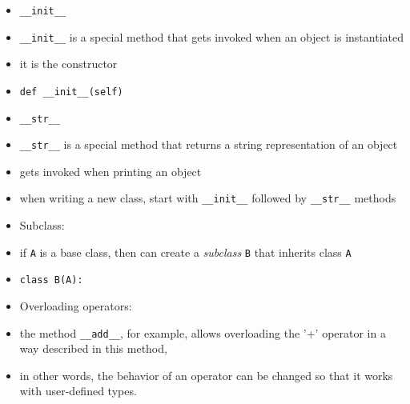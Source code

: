 \documentclass[onecolumn]{IEEEtran} %
\begin{document}
\begin{itemize}
        \item \verb|__init__|
        \bi
            \item \verb|__init__| is a special method that gets invoked when an object is instantiated
            \bi
                \item it is the constructor
            \ei
            \item \verb|def __init__(self)|
        \ei
        \item \verb|__str__|
        \bi
            \item \verb|__str__| is a special method that returns a string representation of an object
            \item gets invoked when printing an object
        \ei
        \item when writing a new class, start with \verb|__init__| followed by \verb|__str__| methods
    \ei
    \item Subclass:
    \bi
        \item if \verb|A| is a base class, then can create a \emph{subclass} \verb|B| that inherits class \verb|A|
        \item  \verb|class B(A):|
    \ei
    \item Overloading operators:
    \bi
        \item the method \verb|__add__|, for example, allows overloading the '+' operator in a way described in this method,
        \item in other words, the behavior of an operator can be changed so that it works with user-defined types.
    \ei
\end{itemize}

\newpage
\end{document}
